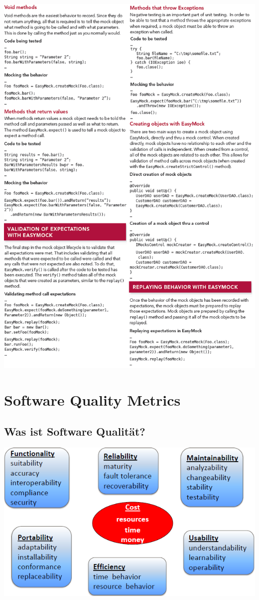 \documentclass[a4paper,10pt]{article}
\begin{document}
\includegraphics[scale=0.8]{EasyMockStuff.png}

\pagebreak
\section{Software Quality Metrics}
\subsection{Was ist Software Qualität?}
\includegraphics[scale=1]{Metrics.png}
\end{document}
